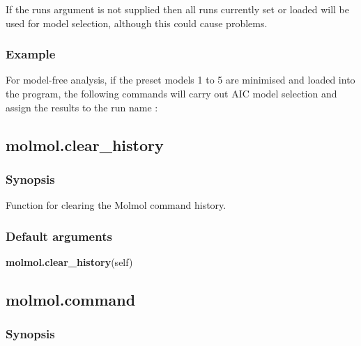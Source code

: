 If the runs argument is not supplied then all runs currently set or loaded will be used for
model selection, although this could cause problems.


\subsubsection{Example}

For model-free analysis, if the preset models 1 to 5 are minimised and loaded into the
program, the following commands will carry out AIC model selection and assign the results
to the run name 
:







\newpage

\subsection{molmol.clear\_history}


\subsubsection{Synopsis}

Function for clearing the Molmol command history.

\subsubsection{Default arguments}

\textsf{\textbf{molmol.clear\_history}(self)}



\newpage

\subsection{molmol.command}


\subsubsection{Synopsis}

